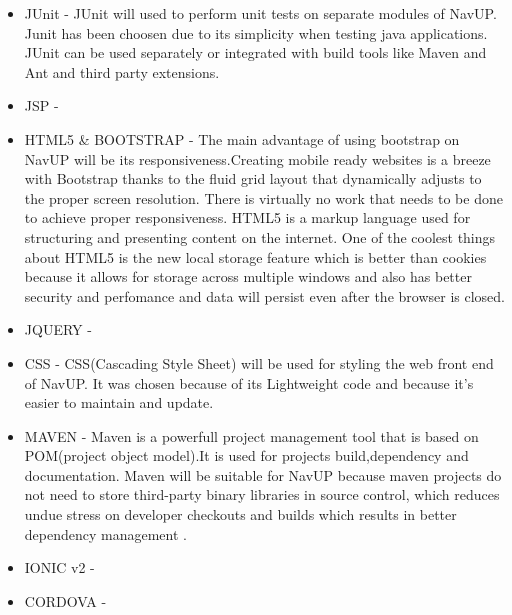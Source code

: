 \begin{itemize}
	\item JUnit - JUnit will used to perform unit tests on separate modules of NavUP. Junit has been choosen due to its simplicity when testing java applications. JUnit can be used separately or integrated with build tools like Maven and Ant and third party extensions.
	
	\item JSP - 
	
	\item HTML5 \& BOOTSTRAP - The main advantage of using bootstrap on NavUP will be its responsiveness.Creating mobile ready websites is a breeze with Bootstrap thanks to the fluid grid layout that dynamically adjusts to the proper screen resolution. There is virtually no work that needs to be done to achieve proper responsiveness. HTML5 is a markup language used for structuring and presenting content on the internet. One of the coolest things about HTML5 is the new local storage feature which is better than cookies because it allows for storage across multiple windows and also has better security and perfomance and data will persist even after the browser is closed.
	
	\item JQUERY - 
	
	\item CSS - CSS(Cascading Style Sheet) will be used for styling the web front end of NavUP. It was chosen because of its Lightweight code and because it's easier to maintain and update. 
	
	\item MAVEN - Maven is a powerfull project management tool that is based on POM(project object model).It is used for projects build,dependency and documentation. Maven will be suitable for NavUP because maven projects do not need to store third-party binary libraries in source control, which reduces undue stress on developer checkouts and builds which results in better dependency management
.	
	
	
	\item IONIC v2 - 
	
	\item CORDOVA - 
	
	
	
\end{itemize}
